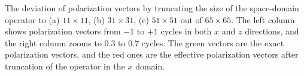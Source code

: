 





{The deviation of polarization vectors by truncating the size of the
  space-domain operator to (a) $11\times11$, (b) $31\times31$, (c)
  $51\times51$ out of $65\times65$. The left column shows polarization
  vectors from ${-1}$ to ${+1}$ cycles in both $x$ and $z$
  directions, and the right column zooms to $0.3$ to $0.7$ cycles. The
  green vectors are the exact polarization vectors, and the red ones
  are the effective polarization vectors after truncation of the
  operator in the $x$ domain.}




